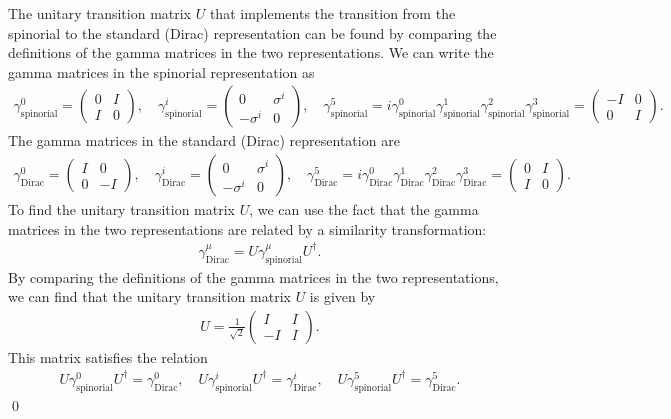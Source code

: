 The unitary transition matrix $U$ that implements the transition from the spinorial to the standard (Dirac) representation can be found by comparing the definitions of the gamma matrices in the two representations. We can write the gamma matrices in the spinorial representation as
\begin{align}
    \gamma^0_{\text{spinorial}} = \begin{pmatrix}
        0 & I \\
        I & 0
    \end{pmatrix}, \quad
    \gamma^i_{\text{spinorial}} = \begin{pmatrix}
        0 & \sigma^i \\
        -\sigma^i & 0
    \end{pmatrix}, \quad
    \gamma^5_{\text{spinorial}} = i\gamma^0_{\text{spinorial}}\gamma^1_{\text{spinorial}}\gamma^2_{\text{spinorial}}\gamma^3_{\text{spinorial}} = \begin{pmatrix}
        -I & 0 \\
        0 & I
    \end{pmatrix}.
\end{align}
The gamma matrices in the standard (Dirac) representation are
\begin{align}
    \gamma^0_{\text{Dirac}} = \begin{pmatrix}
        I & 0 \\
        0 & -I
    \end{pmatrix}, \quad
    \gamma^i_{\text{Dirac}} = \begin{pmatrix}
        0 & \sigma^i \\
        -\sigma^i & 0
    \end{pmatrix}, \quad
    \gamma^5_{\text{Dirac}} = i\gamma^0_{\text{Dirac}}\gamma^1_{\text{Dirac}}\gamma^2_{\text{Dirac}}\gamma^3_{\text{Dirac}} = \begin{pmatrix}
        0 & I \\
        I & 0
    \end{pmatrix}.
\end{align}
To find the unitary transition matrix $U$, we can use the fact that the gamma matrices in the two representations are related by a similarity transformation:
\begin{align}
    \gamma^\mu_{\text{Dirac}} = U \gamma^\mu_{\text{spinorial}} U^\dagger.
\end{align}
By comparing the definitions of the gamma matrices in the two representations, we can find that the unitary transition matrix $U$ is given by
\begin{align}
    U = \frac{1}{\sqrt{2}} \begin{pmatrix}
        I & I \\
        -I & I
    \end{pmatrix}.
\end{align}
This matrix satisfies the relation
\begin{align}
    U \gamma^0_{\text{spinorial}} U^\dagger = \gamma^0_{\text{Dirac}}, \quad
    U \gamma^i_{\text{spinorial}} U^\dagger = \gamma^i_{\text{Dirac}}, \quad
    U \gamma^5_{\text{spinorial}} U^\dagger = \gamma^5_{\text{Dirac}}.
\end{align}
\qed


